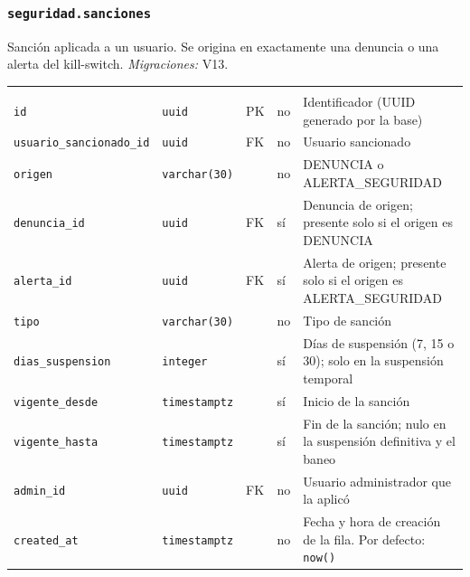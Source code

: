 \subsubsection{\texorpdfstring{\texttt{seguridad.sanciones}}{seguridad.sanciones}}\label{dd:seguridad.sanciones}

Sanción aplicada a un usuario. Se origina en exactamente una denuncia o una alerta del kill-switch. \emph{Migraciones:} V13.

{\small
\begin{xltabular}{\textwidth}{@{}>{\raggedright\arraybackslash}p{3.6cm} >{\raggedright\arraybackslash}p{2.3cm} >{\raggedright\arraybackslash}p{1cm} >{\centering\arraybackslash}p{0.85cm} L@{}}
    \toprule
     &  &  &  &  \\
    \midrule
    \endfirsthead
    \toprule
     &  &  &  &  \\
    \midrule
    \endhead
    \bottomrule
    \endfoot
    \texttt{id} & \texttt{uuid} & PK & no & Identificador (UUID generado por la base) \\
    \texttt{usuario\_\allowbreak{}sancionado\_\allowbreak{}id} & \texttt{uuid} & FK & no & Usuario sancionado \\
    \texttt{origen} & \texttt{varchar(\allowbreak{}30)} &  & no & DENUNCIA o ALERTA\_SEGURIDAD \\
    \texttt{denuncia\_\allowbreak{}id} & \texttt{uuid} & FK & sí & Denuncia de origen; presente solo si el origen es DENUNCIA \\
    \texttt{alerta\_\allowbreak{}id} & \texttt{uuid} & FK & sí & Alerta de origen; presente solo si el origen es ALERTA\_SEGURIDAD \\
    \texttt{tipo} & \texttt{varchar(\allowbreak{}30)} &  & no & Tipo de sanción \\
    \texttt{dias\_\allowbreak{}suspension} & \texttt{integer} &  & sí & Días de suspensión (7, 15 o 30); solo en la suspensión temporal \\
    \texttt{vigente\_\allowbreak{}desde} & \texttt{timestamptz} &  & sí & Inicio de la sanción \\
    \texttt{vigente\_\allowbreak{}hasta} & \texttt{timestamptz} &  & sí & Fin de la sanción; nulo en la suspensión definitiva y el baneo \\
    \texttt{admin\_\allowbreak{}id} & \texttt{uuid} & FK & no & Usuario administrador que la aplicó \\
    \texttt{created\_\allowbreak{}at} & \texttt{timestamptz} &  & no & Fecha y hora de creación de la fila. Por defecto: \texttt{now(\allowbreak{})} \\
\end{xltabular}
}


